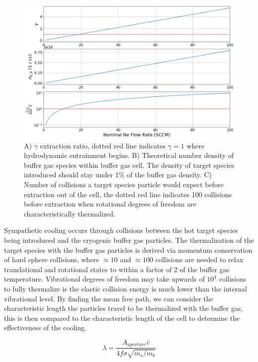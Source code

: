 \begin{figure}[H]
	\centering
	\includegraphics[width=1\textwidth]{images/CBGB_flow_characteristic.png}
	\caption{A) $\gamma$ extraction ratio, dotted red line indicates $\gamma = 1$ where hydrodynamic entrainment begins. B) Theoretical number density of buffer gas species within buffer gas cell. The density of target species introduced should stay under 1\% of the buffer gas density. C) Number of collisions a target species particle would expect before extraction out of the cell, the dotted red line indicates 100 collisions before extraction when rotational degrees of freedom are characteristically thermalized.}
	\label{fig: buffer_gas_flow}
\end{figure}

Sympathetic cooling occurs through collisions between the hot target species being introduced and the cryogenic buffer gas particles. The thermalization of the target species with the buffer gas particles is derived via momentum conservation of hard sphere collisions, where $\approx 10$ and $\approx 100$ collisions are needed to relax translational and rotational states to within a factor of 2 of the buffer gas temperature. Vibrational degrees of freedom may take upwards of $10^4$ collisions to fully thermalize is the elastic collision energy is much lower than the internal vibrational level. By finding the mean free path, we can consider the characteristic length the particles travel to be thermalized with the buffer gas, this is then compared to the characteristic length of the cell to determine the effectiveness of the cooling.

\begin{equation*}
	\lambda = \frac{A_{aperture} \bar{v}}{4 f \sigma \sqrt{m_s/m_b}}
\end{equation*}

